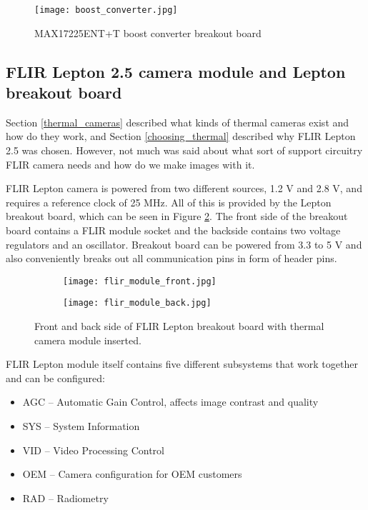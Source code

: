 \begin{figure}[ht]
        \centering
        \texttt{[image: boost\_converter.jpg]} 
        \caption{ MAX17225ENT+T boost converter breakout board}
        \label{boost_converter}
\end{figure}

\subsection{ FLIR Lepton 2.5 camera module and Lepton breakout board}

Section \ref{thermal_cameras} described what kinds of thermal cameras exist and how do they work, and Section \ref{choosing_thermal} described why FLIR Lepton 2.5 was chosen.
However, not much was said about what sort of support circuitry FLIR camera needs and how do we make images with it.

FLIR Lepton camera is powered from two different sources, 1.2 \si{\volt} and 2.8 \si{\volt}, and requires a reference clock of 25 \si{\mega\hertz}.
All of this is provided by the Lepton breakout board, which can be seen in Figure \ref{lepton_breakout}.
The front side of the breakout board contains a FLIR module socket and the backside contains two voltage regulators and an oscillator.
Breakout board can be powered from 3.3 to 5 \si{\volt} and also conveniently breaks out all communication pins in form of header pins.

\begin{figure}[ht] 
    \begin{subfigure}[b]{0.5\textwidth}
        \centering
        \texttt{[image: flir\_module\_front.jpg]} 
    \end{subfigure}
    \begin{subfigure}[b]{0.5\textwidth}
        \centering
        \texttt{[image: flir\_module\_back.jpg]} 
    \end{subfigure}
    \caption{ Front and back side of FLIR Lepton breakout board with thermal camera module inserted.}
    \label{lepton_breakout}
\end{figure}

FLIR Lepton module itself contains five different subsystems that work together and can be configured:

\begin{itemize}
    \item AGC – Automatic Gain Control, affects image contrast and quality
    \item SYS – System Information
    \item VID – Video Processing Control
    \item OEM – Camera configuration for OEM customers
    \item RAD – Radiometry
\end{itemize}

